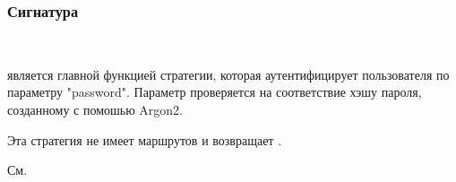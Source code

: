 \subsubsection{Сигнатура\label{signature}}%
\label{page-FPauth-strategies-module-FPauth+u+strategies-module-Password-module-Make-type-entity}\\
\label{page-FPauth-strategies-module-FPauth+u+strategies-module-Password-module-Make-val-call}\begin{ocamlindent} является главной функцией стратегии, которая аутентифицирует пользователя по параметру "password". Параметр проверяется на соответствие хэшу пароля, созданному с помошью Argon2.\end{ocamlindent}%
\medbreak
\label{page-FPauth-strategies-module-FPauth+u+strategies-module-Password-module-Make-val-routes}\begin{ocamlindent}Эта стратегия не имеет маршрутов и возвращает .\end{ocamlindent}%
\medbreak
\label{page-FPauth-strategies-module-FPauth+u+strategies-module-Password-module-Make-val-name}\begin{ocamlindent}См. \hyperref[page-FPauth-strategies-module-FPauth+u+strategies-module-Password-val-name]{}\end{ocamlindent}%
\medbreak


